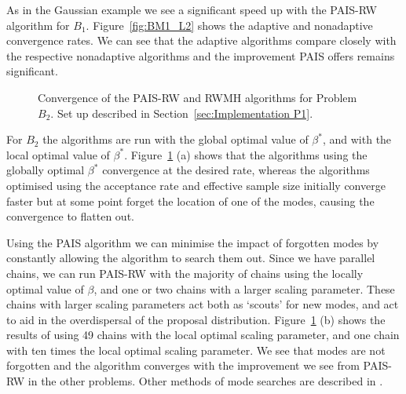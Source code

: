 \documentclass[final]{siamltex}
\begin{document}
As in the Gaussian example we see a significant speed up with the PAIS-RW algorithm for $B_1$. Figure~\ref{fig:BM1_L2} shows the adaptive and nonadaptive convergence rates. We can see that the adaptive algorithms compare closely with the
respective nonadaptive algorithms and the improvement PAIS offers remains significant.

\begin{figure}[htb]
\centering
{}
\caption{Convergence of the PAIS-RW and RWMH algorithms for Problem $B_2$. Set up described in Section~\ref{sec:Implementation P1}.}
\label{fig:BM2_L2}
\end{figure}

For $B_2$ the algorithms are run with the global optimal value of $\beta^*$, and with the local optimal value of $\beta^*$. Figure~\ref{fig:BM2_L2} (a) shows that the algorithms using the globally optimal $\beta^*$ convergence at the desired rate, whereas the algorithms optimised using the acceptance rate and effective sample size initially converge faster but at some point forget the location of one of the modes, causing the convergence to flatten out.

Using the PAIS algorithm we can minimise the impact of forgotten modes by constantly allowing the algorithm to search them out. Since we have parallel chains, we can run PAIS-RW with the majority of chains using the locally optimal value of $\beta$, and one or two chains with a larger scaling parameter. These chains with larger scaling parameters act both as `scouts' for new modes, and act to aid in the overdispersal of the proposal distribution. Figure~\ref{fig:BM2_L2} (b) shows the results of using 49 chains with the local optimal scaling parameter, and one chain with ten times the local optimal scaling parameter. We see that modes are not forgotten and the algorithm converges with the improvement we see from PAIS-RW in the other problems. Other methods of mode searches are described in \cite{lan2013wormhole}.
\end{document}
